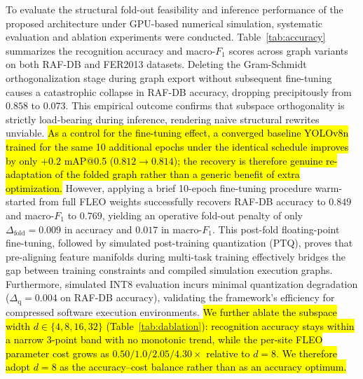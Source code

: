 \documentclass[algorithms,article,submit,moreauthors]{Definitions/mdpi}
\newcommand{\rev}[1]{\hl{#1}}
\begin{document}
To evaluate the structural fold-out feasibility and inference performance of the proposed architecture under GPU-based numerical simulation, systematic evaluation and ablation experiments were conducted. Table~\ref{tab:accuracy} summarizes the recognition accuracy and macro-$F_1$ scores across graph variants on both RAF-DB and FER2013 datasets. Deleting the Gram-Schmidt orthogonalization stage during graph export without subsequent fine-tuning causes a catastrophic collapse in RAF-DB accuracy, dropping precipitously from $0.858$ to $0.073$. This empirical outcome confirms that subspace orthogonality is strictly load-bearing during inference, rendering naive structural rewrites unviable. \rev{As a control for the fine-tuning effect, a converged baseline YOLOv8n trained for the same 10 additional epochs under the identical schedule improves by only \mbox{$+0.2$} mAP@0.5 (\mbox{$0.812 \rightarrow 0.814$}); the recovery is therefore genuine re-adaptation of the folded graph rather than a generic benefit of extra optimization.} However, applying a brief 10-epoch fine-tuning procedure warm-started from full FLEO weights successfully recovers RAF-DB accuracy to $0.849$ and macro-$F_1$ to $0.769$, yielding an operative fold-out penalty of only $\Delta_{\mathrm{fold}} = 0.009$ in accuracy and $0.017$ in macro-$F_1$. This post-fold floating-point fine-tuning, followed by simulated post-training quantization (PTQ), proves that pre-aligning feature manifolds during multi-task training effectively bridges the gap between training constraints and compiled simulation execution graphs. Furthermore, simulated INT8 evaluation incurs minimal quantization degradation ($\Delta_{\mathrm{q}} = 0.004$ on RAF-DB accuracy), validating the framework's efficiency for compressed software execution environments. \rev{We further ablate the subspace width \mbox{$d \in \{4, 8, 16, 32\}$} (Table~\ref{tab:dablation}): recognition accuracy stays within a narrow \mbox{$3$}-point band with no monotonic trend, while the per-site FLEO parameter cost grows as \mbox{$0.50/1.0/2.05/4.30\times$} relative to \mbox{$d=8$}. We therefore adopt \mbox{$d=8$} as the accuracy--cost balance rather than as an accuracy optimum.}
\end{document}

